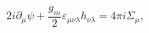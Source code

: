 \begin{equation}
\label{SSP1}
2i\partial_\mu\psi+\frac{g_m}{2}\varepsilon_{\mu\nu\lambda}h_{\nu\lambda}=4\pi i\Sigma_\mu,
\end{equation}


